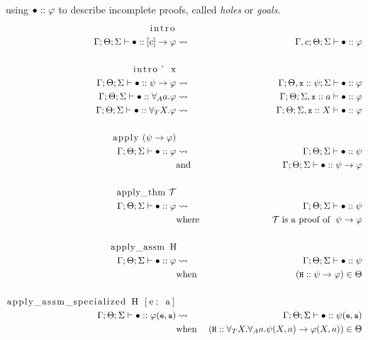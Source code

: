 \documentclass[english, mgr]{iithesis}
\renewcommand{\tt}[1]{\texttt{\small{#1}}}
\renewcommand{\it}[1]{\textit{#1}}
\begin{document}
using $\bullet::\varphi$ to describe incomplete proofs,
called \it{holes} or \it{goals}.
\begin{eqnarray*}
  \text{\lstinline[columns=fixed]{intro}} & & \\
    \jgmnt[\Gamma; \Theta; \Sigma]{\hole\ofkind{\fCImp{\constr}{\formphi}}} & \leadsto & \jgmnt[\Gamma, \constr; \Theta; \Sigma]{\hole\ofkind\formphi} \\
  & & \\
  \text{\lstinline[columns=fixed]{intro' x}} & & \\
  \jgmnt[\Gamma; \Theta; \Sigma]{\hole\ofkind{\psi\fImp\formphi}} & \leadsto & \jgmnt[\Gamma; \Theta, \tt{x} \ofkind\psi ; \Sigma]{\hole\ofkind\formphi} \\
  \jgmnt[\Gamma; \Theta; \Sigma]{\hole\ofkind{\fForallAtom{\atomv}{\formphi}}} & \leadsto & \jgmnt[\Gamma; \Theta; \Sigma, \tt{x} \ofkind\atomv]{\hole\ofkind\formphi} \\
  \jgmnt[\Gamma; \Theta; \Sigma]{\hole\ofkind{\fForallTerm{\termv}{\formphi}}} & \leadsto & \jgmnt[\Gamma; \Theta; \Sigma, \tt{x} \ofkind\termv]{\hole\ofkind\formphi} \\
  & & \\
  \text{\lstinline[columns=fixed]{apply} } (\psi \fImp \formphi)& & \\
  \jgmnt[\Gamma; \Theta; \Sigma]{\hole\ofkind{{\formphi}}} & \leadsto & \jgmnt[\Gamma; \Theta; \Sigma]{\hole\ofkind\psi} \\
  &   \text{and} & \jgmnt[\Gamma; \Theta; \Sigma]{\hole\ofkind\psi \fImp \formphi} \\
  & & \\
  \text{\lstinline[columns=fixed]{apply_thm} }  \mathcal{T} & & \\
    \jgmnt[\Gamma; \Theta; \Sigma]{\hole\ofkind{{\formphi}}} & \leadsto & \jgmnt[\Gamma; \Theta; \Sigma]{\hole\ofkind\psi} \\
   & \text{where} & \mathcal{T} \;\text{is a proof of }\; {\psi \fImp \formphi } \\
  & & \\
  \text{\lstinline[columns=fixed]{apply_assm H}} & & \\
    \jgmnt[\Gamma; \Theta; \Sigma]{\hole\ofkind{{\formphi}}} & \leadsto & \jgmnt[\Gamma; \Theta; \Sigma]{\hole\ofkind\psi} \\
   & \text{when} & (\tt{H} \ofkind {\psi\fImp\formphi }) \in \Theta \\
  & & \\
  \text{\lstinline[columns=fixed]{apply_assm_specialized H [e; a]}} & & \\
    \jgmnt[\Gamma; \Theta; \Sigma]{\hole\ofkind{{\formphi(\tt{e}, \tt{a})}}} & \leadsto & \jgmnt[\Gamma; \Theta; \Sigma]{\hole\ofkind\psi(\tt{e}, \tt{a})} \\
   & \text{when} & (\tt{H} \ofkind {\kForallTerm{X}\kForallAtom{a} \psi(X, a)\fImp\formphi(X, a) }) \in \Theta
  \end{eqnarray*}
\end{document}
